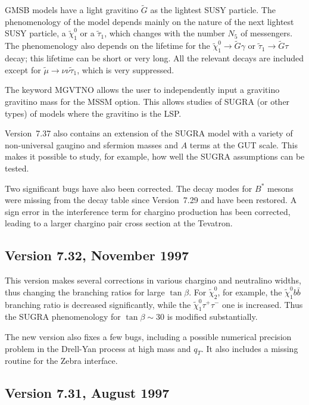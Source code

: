         GMSB models have a light gravitino $\tilde G$ as the lightest
SUSY particle. The phenomenology of the model depends mainly on the
nature of the next lightest SUSY particle, a $\tilde\chi_1^0$ or a
$\tilde\tau_1$, which changes with the number $N_5$ of messengers. The
phenomenology also depends on the lifetime for the $\tilde\chi_1^0 \to
\tilde G \gamma$ or $\tilde\tau_1 \to \tilde G \tau$ decay; this
lifetime can be short or very long. All the relevant decays are
included except for $\tilde\mu \to \nu \nu \tilde\tau_1$, which is very
suppressed.

        The keyword MGVTNO allows the user to independently input a
gravitino gravitino mass for the MSSM option. This allows studies of
SUGRA (or other types) of models where the gravitino is the LSP.

        Version~7.37 also contains an extension of the SUGRA model
with a variety of non-universal gaugino and sfermion masses and $A$
terms at the GUT scale. This makes it possible to study, for example,
how well the SUGRA assumptions can be tested.

        Two significant bugs have also been corrected. The decay modes
for $B^*$ mesons were missing from the decay table since Version~7.29
and have been restored. A sign error in the interference term for
chargino production has been corrected, leading to a larger chargino
pair cross section at the Tevatron.

\subsection{Version 7.32, November 1997}

        This version makes several corrections in various chargino and
neutralino widths, thus changing the branching ratios for large
$\tan\beta$. For $\tilde\chi_2^0$, for example, the $\tilde\chi_1^0
b\bar b$ branching ratio is decreased significantly, while the
$\tilde\chi_1^0 \tau^+ \tau^-$ one is increased. Thus the SUGRA
phenomenology for $\tan\beta \sim 30$ is modified substantially.

        The new version also fixes a few bugs, including a possible
numerical precision problem in the Drell-Yan process at high mass and
$q_T$. It also includes a missing routine for the Zebra interface.

\subsection{Version 7.31, August 1997}

